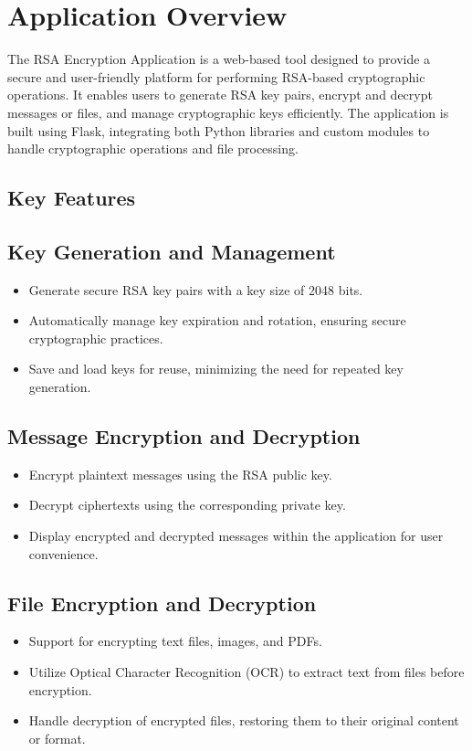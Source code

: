 \documentclass[12pt]{article}
\begin{document}
\section{ Application Overview}
The RSA Encryption Application is a web-based tool designed to provide a secure and user-friendly platform for performing RSA-based cryptographic operations. It enables users to generate RSA key pairs, encrypt and decrypt messages or files, and manage cryptographic keys efficiently. The application is built using Flask, integrating both Python libraries and custom modules to handle cryptographic operations and file processing.

\subsection{Key Features}

\subsection*{Key Generation and Management}
\begin{itemize}
    \item Generate secure RSA key pairs with a key size of 2048 bits.
    \item Automatically manage key expiration and rotation, ensuring secure cryptographic practices.
    \item Save and load keys for reuse, minimizing the need for repeated key generation.
\end{itemize}

\subsection*{Message Encryption and Decryption}
\begin{itemize}
    \item Encrypt plaintext messages using the RSA public key.
    \item Decrypt ciphertexts using the corresponding private key.
    \item Display encrypted and decrypted messages within the application for user convenience.
\end{itemize}

\subsection*{File Encryption and Decryption}
\begin{itemize}
    \item Support for encrypting text files, images, and PDFs.
    \item Utilize Optical Character Recognition (OCR) to extract text from files before encryption.
    \item Handle decryption of encrypted files, restoring them to their original content or format.
\end{itemize}
\end{document}
